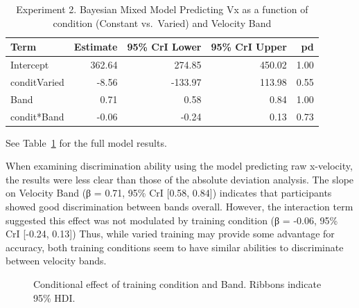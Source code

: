 \documentclass[
  letterpaper,
  DIV=11,
  numbers=noendperiod,
  oneside]{scrartcl}
\begin{document}
\begin{longtable}[]{@{}lrrrr@{}}

\caption{\label{tbl-e2-bmm-vx}Experiment 2. Bayesian Mixed Model
Predicting Vx as a function of condition (Constant vs.~Varied) and
Velocity Band}

\tabularnewline

\toprule\noalign{}
Term & Estimate & 95\% CrI Lower & 95\% CrI Upper & pd \\
\midrule\noalign{}
\endhead
\bottomrule\noalign{}
\endlastfoot
Intercept & 362.64 & 274.85 & 450.02 & 1.00 \\
conditVaried & -8.56 & -133.97 & 113.98 & 0.55 \\
Band & 0.71 & 0.58 & 0.84 & 1.00 \\
condit*Band & -0.06 & -0.24 & 0.13 & 0.73 \\

\end{longtable}

See Table~\ref{tbl-e2-bmm-vx} for the full model results.

When examining discrimination ability using the model predicting raw
x-velocity, the results were less clear than those of the absolute
deviation analysis. The slope on Velocity Band (β = 0.71, 95\% CrI
{[}0.58, 0.84{]}) indicates that participants showed good discrimination
between bands overall. However, the interaction term suggested this
effect was not modulated by training condition (β = -0.06, 95\% CrI
{[}-0.24, 0.13{]}) Thus, while varied training may provide some
advantage for accuracy, both training conditions seem to have similar
abilities to discriminate between velocity bands.

\begin{figure}


\caption{\label{fig-e2-bmm-vx}Conditional effect of training condition
and Band. Ribbons indicate 95\% HDI.}

\end{figure}%
\end{document}
